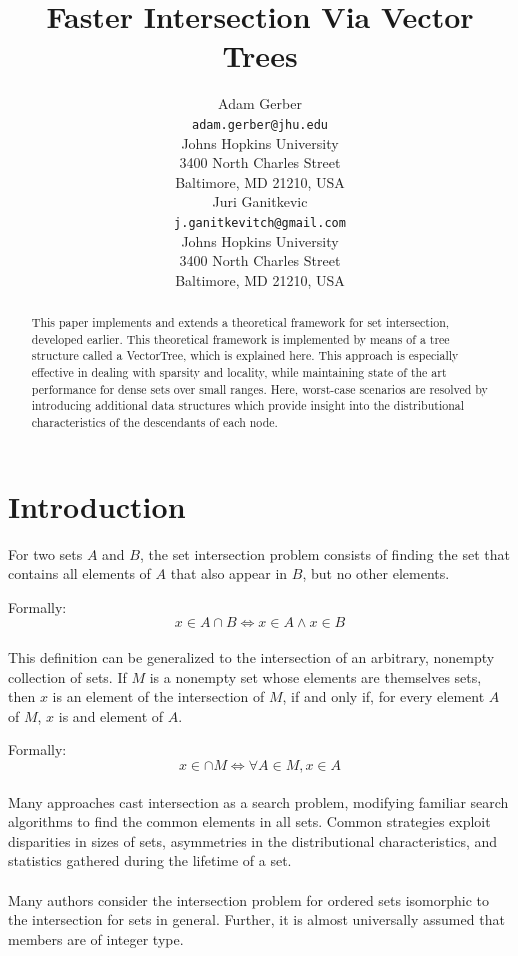 \documentclass[11pt,letterpaper]{article}
\title{Faster Intersection Via Vector Trees}
\author{
	Adam Gerber \\
	{\tt adam.gerber@jhu.edu}\\
	Johns Hopkins University\\
	3400 North Charles Street \\
	Baltimore, MD 21210, USA\\
	\And 
	{Juri Ganitkevic} \\
	{\tt j.ganitkevitch@gmail.com}\\
	Johns Hopkins University\\
	3400 North Charles Street \\
	Baltimore, MD 21210, USA
}
\begin{document}
\maketitle

\begin{abstract}
This paper implements and extends a theoretical framework
for set intersection, developed earlier.  This theoretical framework is
implemented by means of a tree structure called a VectorTree, which
is explained here.  This approach is especially effective
in dealing with sparsity and locality, while maintaining
state of the art performance for dense sets over small ranges.
Here, worst-case scenarios are resolved by introducing
additional data structures which provide insight into the
distributional characteristics of the descendants of each node.
\end{abstract}


\section{Introduction}
For two sets $A$ and $B$, the set intersection problem consists of
finding the set that contains all elements of $A$ that also appear in $B$,
but no other elements. 

Formally: 
\[x \in A \cap B \iff x \in A \land x \in B\]

\paragraph{}
This definition can be generalized to the intersection of an arbitrary,
nonempty collection of sets. If $M$ is a nonempty set whose elements
are themselves sets, then $x$ is an element of the intersection of $M$,
 if and only if, for every element $A$ of $M$, $x$ is and element of $A$.

Formally:
\[ x \in \cap M \iff \forall A \in M, x \in A\]

\paragraph{}
Many approaches cast intersection as a search problem, modifying familiar
search algorithms to find the common elements in all sets.  Common strategies
exploit disparities in sizes of sets, asymmetries in the distributional characteristics,
and statistics gathered during the lifetime of a set.

\paragraph{}
Many authors consider the intersection problem for ordered sets isomorphic
to the intersection for sets in general.  Further, it is almost universally assumed
that members are of integer type.
\end{document}
